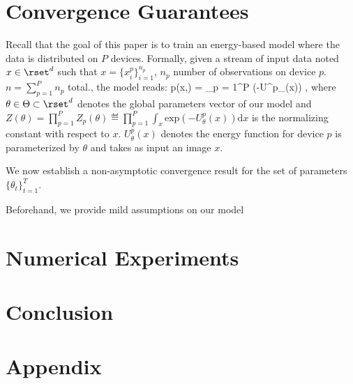 \documentclass[11pt]{article}
\begin{document}
\section{Convergence Guarantees}\label{sec:theory}

Recall that the goal of this paper is to train an energy-based model where the data is distributed on $P$ devices.
Formally, given a stream of input data noted $x \in \rset^d$ such that $x = \{ x^p_{i} \}_{i=1}^{n_p}$, $n_p$ number of observations on device $p$. $n = \sum_{p=1}^P n_p$ total., the model reads:
\beq\label{eq:distebm}
p(x,\theta) = \prod_{p = 1}^P  (-U^p_{\theta}(x)) \eqsp,
\eeq
where $\theta \in \Theta \subset \rset^d$ denotes the global parameters vector of our model and $Z(\theta) = \prod_{p=1}^P Z_p(\theta) \eqdef \prod_{p=1}^P \int_{x} \mathrm{exp}(-U^p_{\theta}(x)) \textrm{d}x$ is the normalizing constant with respect to $x$.
$U^p_{\theta}(x)$ denotes the energy function for device $p$ is parameterized by $\theta$ and takes as input an image $x$.




We now establish a non-asymptotic convergence result for the set of parameters $\{ \theta_{t}\}_{t=1}^T$.

Beforehand, we provide mild assumptions on our model 

\section{Numerical Experiments}\label{sec:numericals}


\section{Conclusion}\label{sec:conclusion}



\newpage



\newpage
\appendix 

\section{Appendix}\label{sec:appendix}


\end{document}
